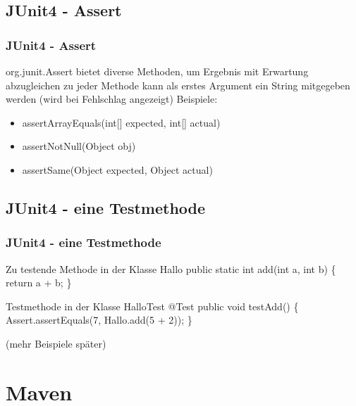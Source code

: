 \documentclass[18pt]{beamer}
\begin{document}
	\subsection{JUnit4 - Assert}
	\begin{frame}
		\frametitle{JUnit4 - Assert}
		org.junit.Assert bietet diverse Methoden, um Ergebnis mit Erwartung abzugleichen \linebreak
		zu jeder Methode kann als erstes Argument ein String mitgegeben werden (wird bei Fehlschlag angezeigt) \linebreak
		Beispiele:
		\begin{itemize}
			\item assertArrayEquals(int[] expected, int[] actual)
			\item assertNotNull(Object obj)
			\item assertSame(Object expected, Object actual)
		\end{itemize}
	\end{frame}
	
	\subsection{JUnit4 - eine Testmethode}
	\begin{frame}
		\frametitle{JUnit4 - eine Testmethode}
		\begin{block}{Zu testende Methode in der Klasse Hallo}
				public static int add(int a, int b) \{ \linebreak
					 return a + b; \linebreak
				      \}	
		\end{block} 
		\begin{block}{Testmethode in der Klasse HalloTest}
			@Test\linebreak
			public void testAdd() \{ \linebreak
				Assert.assertEquals(7, Hallo.add(5 + 2)); \linebreak
			\}
		\end{block}
		(mehr Beispiele später)
	\end{frame}
		
\section{Maven}
\end{document}
